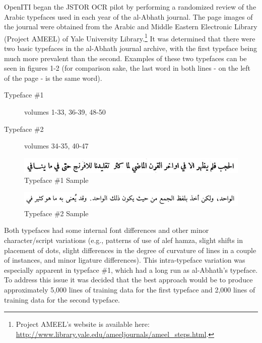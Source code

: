 OpenITI began the JSTOR OCR pilot by performing a randomized review of the
Arabic typefaces used in each year of the al-Abhath journal. The page images of
the journal were obtained from the Arabic and Middle Eastern Electronic Library
(Project AMEEL) of Yale University Library.\footnote{Project AMEEL’s website is
available here:
\url{http://www.library.yale.edu/ameeljournals/ameel_steps.html}.} It was
determined that there were two basic typefaces in the al-Abhath journal
archive, with the first typeface being much more prevalent than the second.
Examples of these two typefaces can be seen in figures 1-2 (for comparison
sake, the last word in both lines - on the left of the page - is the same
word).

\begin{description}
	\item[Typeface \#1] volumes 1-33, 36-39, 48-50
	\item[Typeface \#2] volumes 34-35, 40-47
\end{description}

\begin{figure}[h]
	\includegraphics[width=\linewidth]{images/image8.png}
	\caption{Typeface \#1 Sample}
	\label{fig:fig1} 
\end{figure}

\begin{figure}[h]
	\includegraphics[width=\linewidth]{images/image9.png}
	\caption{Typeface \#2 Sample}
	\label{fig:fig2} 
\end{figure}

Both typefaces had some internal font differences and other minor
character/script variations (e.g., patterns of use of alef hamza, slight shifts
in placement of dots, slight differences in the degree of curvature of lines in
a couple of instances, and minor ligature differences). This intra-typeface
variation was especially apparent in typeface \#1, which had a long run as
al-Abhath’s typeface. To address this issue it was decided that the best
approach would be to produce approximately 5,000 lines of training data for the
first typeface and 2,000 lines of training data for the second typeface. 

